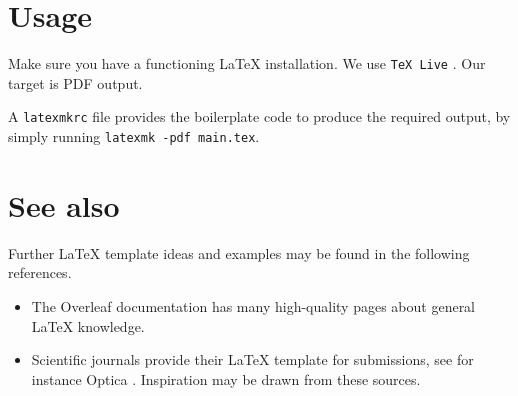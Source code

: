 \section{Usage}
Make sure you have a functioning LaTeX installation. We use \lstinline{TeX Live}
\cite{texlive}. Our target is \gls{PDF} output.

A \lstinline{latexmkrc} file provides the boilerplate code to produce the
required output, by simply running \lstinline{latexmk -pdf main.tex}.

\section{See also}
Further LaTeX template ideas and examples may be found in the following
references.

\begin{itemize}
\item The Overleaf documentation \cite{overleaf} has many high-quality
      pages about general LaTeX knowledge.
\item Scientific journals provide their LaTeX template for submissions,
      see for instance Optica \cite{optica-author-resources}. Inspiration
      may be drawn from these sources.
\end{itemize}
